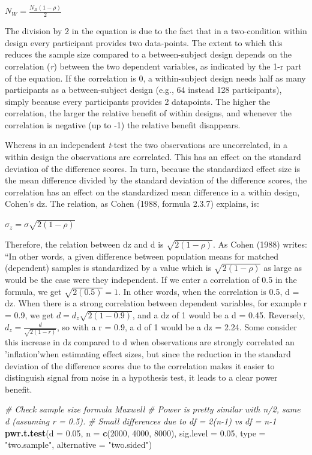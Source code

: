\documentclass[]{article}
\newenvironment{Shaded}{\begin{snugshade}}{\end{snugshade}}
\newcommand{\KeywordTok}[1]{\textcolor[rgb]{0.13,0.29,0.53}{\textbf{#1}}}
\newcommand{\DataTypeTok}[1]{\textcolor[rgb]{0.13,0.29,0.53}{#1}}
\newcommand{\DecValTok}[1]{\textcolor[rgb]{0.00,0.00,0.81}{#1}}
\newcommand{\FloatTok}[1]{\textcolor[rgb]{0.00,0.00,0.81}{#1}}
\newcommand{\StringTok}[1]{\textcolor[rgb]{0.31,0.60,0.02}{#1}}
\newcommand{\CommentTok}[1]{\textcolor[rgb]{0.56,0.35,0.01}{\textit{#1}}}
\newcommand{\NormalTok}[1]{#1}
\begin{document}
\(N_{W}=\frac{N_{B}(1-\rho)}{2}\)

The division by 2 in the equation is due to the fact that in a
two-condition within design every participant provides two data-points.
The extent to which this reduces the sample size compared to a
between-subject design depends on the correlation (\emph{r}) between the
two dependent variables, as indicated by the 1-r part of the equation.
If the correlation is 0, a within-subject design needs half as many
participants as a between-subject design (e.g., 64 instead 128
participants), simply because every participants provides 2 datapoints.
The higher the correlation, the larger the relative benefit of within
designs, and whenever the correlation is negative (up to -1) the
relative benefit disappears.

Whereas in an independent \emph{t}-test the two observations are
uncorrelated, in a within design the observations are correlated. This
has an effect on the standard deviation of the difference scores. In
turn, because the standardized effect size is the mean difference
divided by the standard deviation of the difference scores, the
correlation has an effect on the standardized mean difference in a
within design, Cohen's dz. The relation, as Cohen (1988, formula 2.3.7)
explains, is:

\(\sigma_{z}=\sigma\sqrt{2(1-\rho)}\)

Therefore, the relation between dz and d is \(\sqrt{2(1-\rho)}\). As
Cohen (1988) writes: ``In other words, a given difference between
population means for matched (dependent) samples is standardized by a
value which is \(\sqrt{2(1-\rho)}\) as large as would be the case were
they independent. If we enter a correlation of 0.5 in the formula, we
get \(\sqrt{2(0.5)}=1\). In other words, when the correlation is 0.5, d
= dz. When there is a strong correlation between dependent variables,
for example r = 0.9, we get \(d=d_{z}\sqrt{2(1-0.9)}\), and a dz of 1
would be a d = 0.45. Reversely, \(d_{z}=\frac{d}{\sqrt{2(1-r)}}\), so
with a r = 0.9, a d of 1 would be a dz = 2.24. Some consider this
increase in dz compared to d when observations are strongly correlated
an 'inflation'when estimating effect sizes, but since the reduction in
the standard deviation of the difference scores due to the correlation
makes it easier to distinguish signal from noise in a hypothesis test,
it leads to a clear power benefit.

\begin{Shaded}
\begin{Highlighting}[]
\CommentTok{# Check sample size formula Maxwell}
\CommentTok{# Power is pretty similar with n/2, same d (assuming r = 0.5). }
\CommentTok{# Small differences due to df = 2(n-1) vs df = n-1}
\KeywordTok{pwr.t.test}\NormalTok{(}\DataTypeTok{d =} \FloatTok{0.05}\NormalTok{,}
           \DataTypeTok{n =} \KeywordTok{c}\NormalTok{(}\DecValTok{2000}\NormalTok{, }\DecValTok{4000}\NormalTok{, }\DecValTok{8000}\NormalTok{),}
           \DataTypeTok{sig.level =} \FloatTok{0.05}\NormalTok{,}
           \DataTypeTok{type =} \StringTok{"two.sample"}\NormalTok{,}
           \DataTypeTok{alternative =} \StringTok{"two.sided"}\NormalTok{)}
\end{Highlighting}
\end{Shaded}
\end{document}

